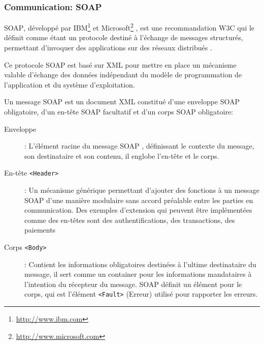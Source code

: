 	\subsubsection{Communication: SOAP}
		\textsc{SOAP}, développé par IBM\footnote{\url{http://www.ibm.com}} et
		Microsoft\footnote{\url{http://www.microsoft.com}} \cite{box2000simple}, est une recommandation \textsc{W3C} 
		qui le définit comme étant un protocole destiné à l'échange de messages structurés, permettant 
		d'invoquer des applications sur des réseaux distribués \cite{mitra2003soap}.

		Ce protocole \textsc{SOAP} est basé sur \textsc{XML} pour mettre en place un mécanisme valable
		d'échange des données indépendant du modèle de programmation de l'application et du système
		d’exploitation.

	      	Un message \textsc{SOAP} est un document XML constitué d'une enveloppe \textsc{SOAP} obligatoire, 
		d'un en-tête \textsc{SOAP} facultatif et d'un corps \textsc{SOAP} obligatoire:

		


		\SpecialItem
		\begin{description} %
		    \item[Enveloppe]:  
			L'élément racine du message \textsc{SOAP} , définissant le contexte du message, son
		       destinataire et son contenu, il englobe l'en-tête et le corps.

		    \item[En-tête \texttt{<Header>}]:
		       	Un mécanisme générique permettant d'ajouter des fonctions à un message
			\textsc{SOAP} d'une manière modulaire sans accord préalable entre les parties en communication. 
			Des exemples d'extension qui peuvent être implémentées comme des en-têtes sont des 
			authentifications, des transactions, des paiements

		    \item[Corps \texttt{<Body>}]: 
			Contient les informations obligatoires destinées à l'ultime destinataire du message, il sert 
			comme un container pour les informations mandataires à l'intention du récepteur du message.
			\textsc{SOAP} définit un élément pour le corps, qui est l'élément \texttt{<Fault>} (Erreur) 
			utilisé pour rapporter les erreurs.
		\end{description}


